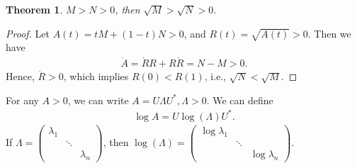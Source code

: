 \documentclass[11pt]{book}
\newtheorem{theorem}{Theorem}[section]
\theoremstyle{definition}
\numberwithin{equation}{subsection}
\begin{document}
\medskip

\begin{theorem}
$M > N > 0$, then $\sqrt{M} > \sqrt{N} > 0$.
\end{theorem}
\begin{proof}
Let $A(t) = tM + (1-t)N > 0$, and $R(t) = \sqrt{A(t)} > 0$. Then we have 
\begin{align*}
    \dot{A} = \dot{R}R + R \dot{R} = N - M > 0.
\end{align*}
Hence, $\dot{R} > 0$, which implies $R(0) < R(1)$, i.e., $\sqrt{N} < \sqrt{M}$.
\end{proof}

\medskip

For any $A > 0$, we can write $A = U \Lambda U^*, \Lambda > 0$. We can define 
\begin{align*}
    \log A = U \log (\Lambda) U^*.
\end{align*}
If $\Lambda = \begin{pmatrix}
\lambda_1 &  &  \\
& \ddots &  \\
&  & \lambda_n
\end{pmatrix}$, then $\log (\Lambda) = \begin{pmatrix}
 \log \lambda_1 &  &  \\
& \ddots &  \\
&  & \log \lambda_n
\end{pmatrix}$.

\medskip
\end{document}
